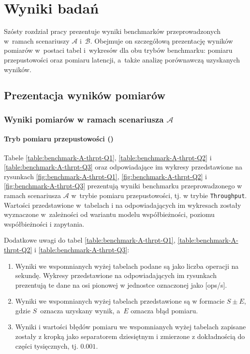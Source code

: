 \chapter{Wyniki badań}

Szósty rozdział pracy prezentuje wyniki benchmarków przeprowadzonych w~ramach scenariuszy $\mathcal{A}$ i~$\mathcal{B}$. Obejmuje on szczegółową prezentację wyników pomiarów w~postaci tabel i~wykresów dla obu trybów benchmarku: pomiaru przepustowości oraz pomiaru latencji, a~także analizę porównawczą uzyskanych wyników.

\section{Prezentacja wyników pomiarów}
\label{sec:results-presentation}

\subsection{Wyniki pomiarów w ramach scenariusza \ensuremath{\mathcal{A}}}
\label{sec:results-scenario-A}

\subsubsection{Tryb pomiaru przepustowości ()}
Tabele \ref{table:benchmark-A-thrpt-Q1}, \ref{table:benchmark-A-thrpt-Q2} i \ref{table:benchmark-A-thrpt-Q3} oraz odpowiadające im wykresy przedstawione na rysunkach \ref{fig:benchmark-A-thrpt-Q1}, \ref{fig:benchmark-A-thrpt-Q2} i \ref{fig:benchmark-A-thrpt-Q3} prezentują wyniki benchmarku przeprowadzonego w ramach scenariusza $\mathcal{A}$ w~trybie pomiaru przepustowości, tj. w trybie \texttt{Throughput}. Wartości przedstawione w~tabelach i na odpowiadających im wykresach zostały wyznaczone w~zależności od wariantu modelu współbieżności, poziomu współbieżności i zapytania.

\noindent
Dodatkowe uwagi do tabel \ref{table:benchmark-A-thrpt-Q1}, \ref{table:benchmark-A-thrpt-Q2} i \ref{table:benchmark-A-thrpt-Q3}:
\begin{enumerate}[label=(\roman*)]
    \item Wyniki we wspomnianych wyżej tabelach podane są jako liczba operacji na sekundę. Wykresy przedstawione na odpowiadających im rysunkach prezentują te dane na osi pionowej w jednostce oznaczonej jako [ops/s].
    \item Wyniki we wspomnianych wyżej tabelach przedstawione są w formacie $S \pm E$, gdzie $S$~oznacza uzyskany wynik, a~$E$ oznacza błąd pomiaru.
    \item Wyniki i wartości błędów pomiaru we wspomnianych wyżej tabelach zapisane zostały z kropką jako separatorem dziesiętnym i zmierzone z dokładnością do części tysięcznych, tj. $0.001$.
\end{enumerate}

